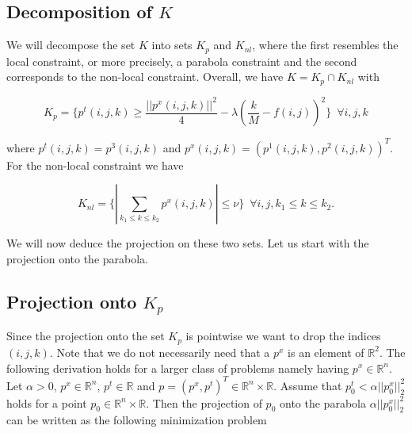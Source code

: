     \subsection{Decomposition of $K$} %
    \label{sub:decomposition_of_K}
        
        We will decompose the set $K$ into sets $K_{p}$ and $K_{nl}$, where the first resembles the local constraint, or more precisely, a parabola constraint and the second corresponds to the non-local constraint. Overall, we have $K = K_{p} \cap K_{nl}$ with

    \begin{equation}
        K_{p} = \bigg\{ p^{t}(i, j, k) \ge \frac{||p^{x}(i, j, k)||^{2}}{4} - \lambda(\frac{k}{M} - f(i,j))^{2} \bigg\} \,\,\, \forall i, j, k \label{eq:parabola}
    \end{equation}

    where $p^{t}(i, j, k) = p^{3}(i, j, k)$ and $p^{x}(i, j, k) = (p^{1}(i, j, k), p^{2}(i, j, k))^{T}$. For the non-local constraint we have

    \begin{equation}
        K_{nl} = \bigg\{ \left| \sum_{k_{1} \le k \le k_{2}} p^{x}(i, j, k) \right| \le \nu \bigg\} \,\,\, \forall i, j, k_{1} \le k \le k_{2}. \label{eq:nonlocal}
    \end{equation}

    We will now deduce the projection on these two sets. Let us start with the projection onto the parabola.


    \subsection{Projection onto $K_{p}$}

        Since the projection onto the set $K_{p}$ is pointwise we want to drop the indices $(i, j, k)$. Note that we do not necessarily need that a $p^{x}$ is an element of $\mathbb{R}^{2}$. The following derivation holds for a larger class of problems namely having $p^{x} \in \mathbb{R}^{n}$. Let $\alpha > 0$, $p^{x} \in \mathbb{R}^{n}$, $p^{t} \in \mathbb{R}$ and $p = (p^{x}, p^{t})^{T} \in \mathbb{R}^{n} \times \mathbb{R}$. Assume that $p_{0}^{t} < \alpha ||p_{0}^{x}||_{2}^{2}$ holds for a point $p_{0} \in \mathbb{R}^{n}\times\mathbb{R}$. Then the projection of $p_{0}$ onto the parabola $\alpha ||p_{0}^{x}||_{2}^{2}$ can be written as the following minimization problem

